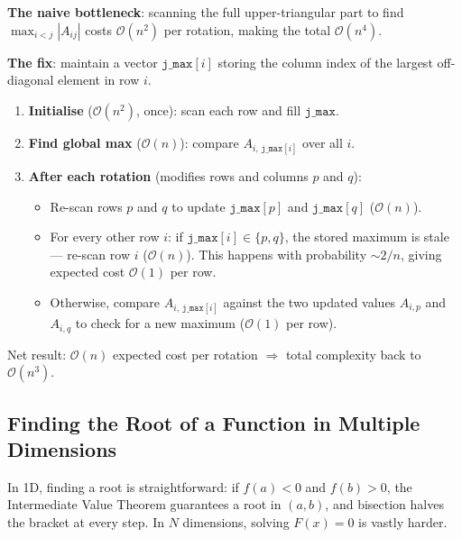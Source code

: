 \documentclass[12pt, a4paper]{article}
\begin{document}
\begin{tcolorbox}[colback=blue!5!white,colframe=blue!75!black,title=Optimisation: Row-Maximum Vector ($\mathcal{O}(n^4) \to \mathcal{O}(n^3)$)]
\textbf{The naive bottleneck}: scanning the full upper-triangular part to find $\max_{i<j}|A_{ij}|$ costs $\mathcal{O}(n^2)$ per rotation, making the total $\mathcal{O}(n^4)$.

\textbf{The fix}: maintain a vector $\mathtt{j\_max}[i]$ storing the column index of the largest off-diagonal element in row $i$.
\begin{enumerate}
    \item \textbf{Initialise} ($\mathcal{O}(n^2)$, once): scan each row and fill $\mathtt{j\_max}$.
    \item \textbf{Find global max} ($\mathcal{O}(n)$): compare $A_{i,\,\mathtt{j\_max}[i]}$ over all $i$.
    \item \textbf{After each rotation} (modifies rows and columns $p$ and $q$):
    \begin{itemize}
        \item Re-scan rows $p$ and $q$ to update $\mathtt{j\_max}[p]$ and $\mathtt{j\_max}[q]$ ($\mathcal{O}(n)$).
        \item For every other row $i$: if $\mathtt{j\_max}[i] \in \{p,q\}$, the stored maximum is stale --- re-scan row $i$ ($\mathcal{O}(n)$). This happens with probability $\sim 2/n$, giving expected cost $\mathcal{O}(1)$ per row.
        \item Otherwise, compare $A_{i,\,\mathtt{j\_max}[i]}$ against the two updated values $A_{i,p}$ and $A_{i,q}$ to check for a new maximum ($\mathcal{O}(1)$ per row).
    \end{itemize}
\end{enumerate}
Net result: $\mathcal{O}(n)$ expected cost per rotation $\Rightarrow$ total complexity back to $\mathcal{O}(n^3)$.
\end{tcolorbox}

\subsection{Finding the Root of a Function in Multiple Dimensions}
\label{subsec:multiroot}
In 1D, finding a root is straightforward: if $f(a) < 0$ and $f(b) > 0$, the Intermediate Value Theorem guarantees a root in $(a,b)$, and bisection halves the bracket at every step. In $N$ dimensions, solving $F(x) = 0$ is vastly harder.
\end{document}
